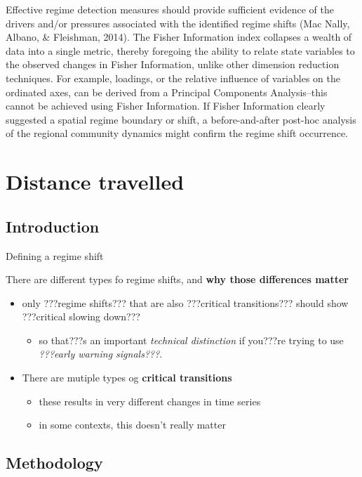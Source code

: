 \documentclass[12pt,twoside,openany]{reedthesis}
\providecommand{\tightlist}{%
  \setlength{\itemsep}{0pt}\setlength{\parskip}{0pt}}
\begin{document}
Effective regime detection measures should provide sufficient evidence
of the drivers and/or pressures associated with the identified regime
shifts (Mac Nally, Albano, \& Fleishman, 2014). The Fisher Information
index collapses a wealth of data into a single metric, thereby foregoing
the ability to relate state variables to the observed changes in Fisher
Information, unlike other dimension reduction techniques. For example,
loadings, or the relative influence of variables on the ordinated axes,
can be derived from a Principal Components Analysis--this cannot be
achieved using Fisher Information. If Fisher Information clearly
suggested a spatial regime boundary or shift, a before-and-after
post-hoc analysis of the regional community dynamics might confirm the
regime shift occurrence.

\chapter{Distance travelled}\label{distance-chapter}

\section{Introduction}\label{introduction-3}

Defining a regime shift

There are different types fo regime shifts, and \textbf{why those
differences matter}
\begin{itemize}
\tightlist
\item
  only ???regime shifts??? that are also ???critical transitions???
  should show ???critical slowing down???
  \begin{itemize}
  \tightlist
  \item
    so that???s an important \emph{technical distinction} if you???re
    trying to use \emph{???early warning signals???}.\\
  \end{itemize}
\item
  There are mutiple types og \textbf{critical transitions}
  \begin{itemize}
  \tightlist
  \item
    these results in very different changes in time series\\
  \item
    in some contexts, this doesn't really matter
  \end{itemize}
\end{itemize}
\section{Methodology}\label{methodology}
\end{document}
